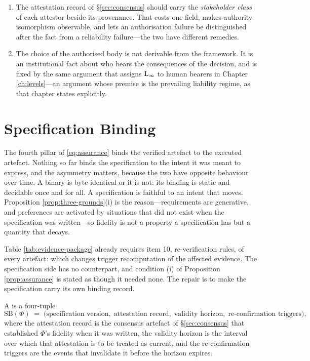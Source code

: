 \begin{remark}\label{rmk:authority-design}
\begin{enumerate}[label=(\alph*)]
\item The attestation record of \S\ref{sec:consensus} should carry the \emph{stakeholder class} of
      each attestor beside its provenance. That costs one field, makes authority isomorphism
      observable, and lets an authorisation failure be distinguished after the fact from a
      reliability failure---the two have different remedies.
\item The choice of the authorised body is not derivable from the framework. It is an institutional
      fact about who bears the consequences of the decision, and is fixed by the same argument that
      assigns $\mathrm{L}_{\infty}$ to human bearers in Chapter \ref{ch:levels}---an argument whose premise
      is the prevailing liability regime, as that chapter states explicitly.
\end{enumerate}
\end{remark}

\section{Specification Binding}\label{sec:spec-binding}

The fourth pillar of \eqref{eq:assurance} binds the verified artefact to the executed artefact.
Nothing so far binds the specification to the intent it was meant to express, and the asymmetry
matters, because the two have opposite behaviour over time. A binary is byte-identical or it is not:
its binding is static and decidable once and for all. A specification is faithful to an intent that
moves. Proposition \ref{prop:three-grounds}(i) is the reason---requirements are generative, and
preferences are activated by situations that did not exist when the specification was written---so
fidelity is not a property a specification has but a quantity that decays.

Table \ref{tab:evidence-package} already requires item 10, re-verification rules, of every artefact:
which changes trigger recomputation of the affected evidence. The specification side has no
counterpart, and condition (i) of Proposition \ref{prop:assurance} is stated as though it needed none. The
repair is to make the specification carry its own binding record.

\begin{definition}\label{def:spec-binding}
A  is a four-tuple
\[
\mathrm{SB}(\Phi) \;=\; \bigl(\text{specification version},\; \text{attestation record},\;
\text{validity horizon},\; \text{re-confirmation triggers}\bigr),
\]
where the attestation record is the consensus artefact of \S\ref{sec:consensus} that established
$\Phi$'s fidelity when it was written, the validity horizon is the interval over which that
attestation is to be treated as current, and the re-confirmation triggers are the events that
invalidate it before the horizon expires.
\end{definition}

